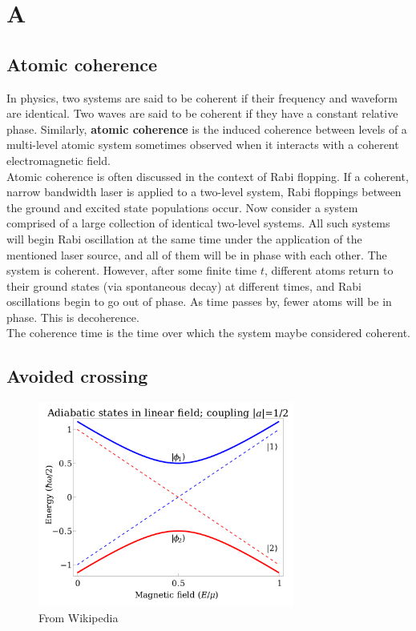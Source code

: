 \documentclass{book}
\theoremstyle{definition}
\begin{document}
\chapter*{A}



\section*{Atomic coherence}

In physics, two systems are said to be coherent if their frequency and waveform are identical. Two waves are said to be coherent if they have a constant relative phase. Similarly, \textbf{atomic coherence} is the induced coherence between levels of a multi-level atomic system sometimes observed when it interacts with a coherent electromagnetic field.\\


Atomic coherence is often discussed in the context of Rabi flopping. If a coherent, narrow bandwidth laser is applied to a two-level system, Rabi floppings between the ground and excited state populations occur. Now consider a system comprised of a large collection of identical two-level systems. All such systems will begin Rabi oscillation at the same time under the application of the mentioned laser source, and all of them will be in phase with each other. The system is coherent. However, after some finite time $t$, different atoms return to their ground states (via spontaneous decay) at different times, and Rabi oscillations begin to go out of phase. As time passes by, fewer atoms will be in phase. This is decoherence. \\

The coherence time is the time over which the system maybe considered coherent. 

\section*{Avoided crossing} 


\begin{figure}[!htb]
	\centering
	\includegraphics*[width=0.75\textwidth]{images/avoided_crossing}
	\caption{From Wikipedia}
\end{figure}
\end{document}
